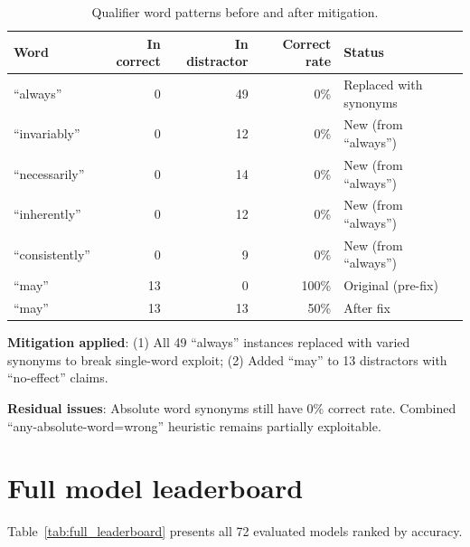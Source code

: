 \documentclass[11pt]{article}
\begin{document}
\begin{table}[htbp]
  \centering
  \caption{Qualifier word patterns before and after mitigation.}
  \label{tab:qualifier_bias}
  \begin{tabular}{lrrrl}
    \toprule
    Word & In correct & In distractor & Correct rate & Status \\
    \midrule
    ``always'' & 0 & 49 & 0\% & Replaced with synonyms \\
    ``invariably'' & 0 & 12 & 0\% & New (from ``always'') \\
    ``necessarily'' & 0 & 14 & 0\% & New (from ``always'') \\
    ``inherently'' & 0 & 12 & 0\% & New (from ``always'') \\
    ``consistently'' & 0 & 9 & 0\% & New (from ``always'') \\
    ``may'' & 13 & 0 & 100\% & Original (pre-fix) \\
    ``may'' & 13 & 13 & 50\% & After fix \\
    \bottomrule
  \end{tabular}
\end{table}

\textbf{Mitigation applied}: (1) All 49 ``always'' instances replaced with varied synonyms to break single-word exploit; (2) Added ``may'' to 13 distractors with ``no-effect'' claims.

\textbf{Residual issues}: Absolute word synonyms still have 0\% correct rate. Combined ``any-absolute-word=wrong'' heuristic remains partially exploitable.

\section{Full model leaderboard}
\label{app:full_leaderboard}

Table~\ref{tab:full_leaderboard} presents all 72 evaluated models ranked by accuracy.
\end{document}
